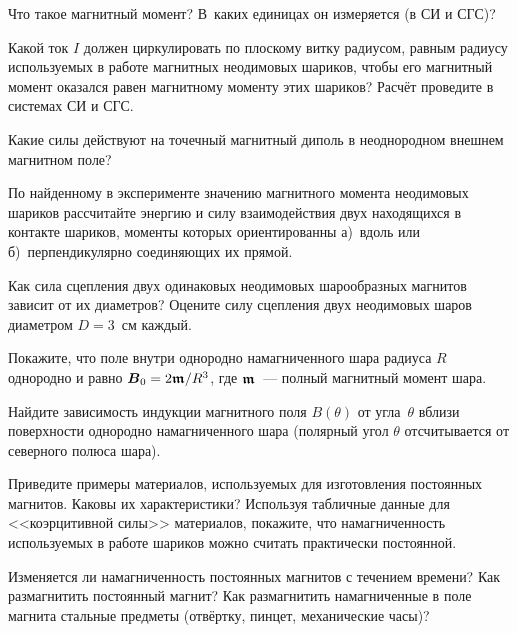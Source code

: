 \begin{lab:questions}

\item Что такое магнитный момент? 
В~каких единицах он измеряется (в СИ и СГС)?

\item Какой ток $I$ должен циркулировать по плоскому витку радиусом, равным радиусу
используемых в работе магнитных неодимовых шариков, чтобы его магнитный момент
оказался равен магнитному моменту этих шариков? Расчёт проведите 
в системах СИ и СГС.

\item Какие силы действуют на точечный магнитный диполь 
в неоднородном внешнем магнитном поле?

\item По найденному в эксперименте значению магнитного момента неодимовых 
шариков рассчитайте энергию и силу взаимодействия двух находящихся 
в контакте шариков, моменты которых ориентированны а)~вдоль или 
б)~перпендикулярно соединяющих их прямой.

\item Как сила сцепления двух одинаковых неодимовых шарообразных магнитов 
зависит от их диаметров? Оцените силу сцепления двух 
неодимовых шаров диаметром $D=3$~см каждый. 

\item Покажите, что поле внутри однородно намагниченного шара 
радиуса  $R$ однородно и равно ${\boldsymbol{B}}_0=2{\boldsymbol{\mathfrak{m}}}/R^3$, 
где ${\boldsymbol{\mathfrak{m}}}$~--- полный магнитный момент шара. 

\item Найдите зависимость индукции магнитного поля  $B(\theta )$ 
от угла~$\theta $ вблизи поверхности однородно намагниченного шара 
(полярный угол $\theta $ отсчитывается от северного полюса шара).


\item Приведите примеры материалов, используемых для изготовления 
постоянных магнитов. Каковы их характеристики? Используя табличные данные
для <<коэрцитивной силы>> материалов, покажите, что намагниченность 
используемых в работе шариков можно считать практически постоянной.

\item Изменяется ли намагниченность постоянных магнитов с течением времени? 
Как размагнитить постоянный магнит? 
Как размагнитить намагниченные в поле магнита стальные предметы
(отвёртку,  пинцет, механические часы)?


\end{lab:questions}
